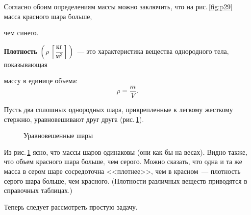 \documentclass[main.tex]{subfiles}
\begin{document}
Согласно обоим определениям массы можно заключить, что на рис.\,\ref{fig:p29} масса красного шара больше, \strut чем синего.  

\textbf{Плотность} $\left(\rho\ \left[\dfrac{\text{кг}}{\text{м}^3}\right]\right)$~--- это характеристика вещества однородного тела, показывающая \strut массу в единице объема:
\begin{equation}
    \label{e7}
    \rho=\dfrac{m}{V}.
\end{equation}

Пусть два сплошных однородных шара, прикрепленные  к легкому жесткому стержню, уравновешивают друг друга (рис.\,\ref{fig:p30}).

    \begin{figure}[H]
    \centering

\caption{Уравновешенные шары}
\label{fig:p30}
\end{figure}

Из рис.\,\ref{fig:p30} ясно, что массы шаров одинаковы (они как бы на весах). Видно также, что объем красного шара больше, чем серого. Можно сказать, что одна и та же масса в сером шаре сосредоточна <<плотнее>>, чем в красном~--- плотность серого шара больше, чем красного. (Плотности различных веществ приводятся в справочных таблицах.)

Теперь следует рассмотреть простую задачу.
\end{document}
